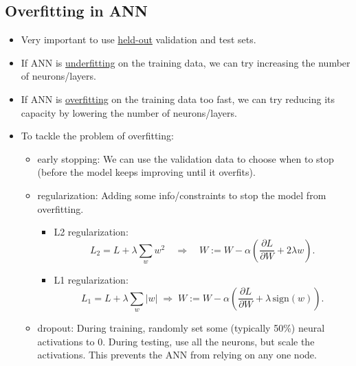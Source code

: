 \documentclass[twocolumn,landscape,10pt]{article}
\theoremstyle{definition}
\begin{document}
\subsection{Overfitting in ANN}

\begin{itemize}
    \item Very important to use \underline{held-out} validation and test sets.
    \item If ANN is \underline{underfitting} on the training data, we can try
        increasing the number of neurons/layers.
    \item If ANN is \underline{overfitting} on the training data too fast, we
        can try reducing its capacity by lowering the number of neurons/layers.
    \item To tackle the problem of overfitting:
        \begin{itemize}
            \item early stopping:
                We can use the validation data to choose when to stop
                (before the model keeps improving until it overfits).
            \item regularization: Adding some info/constraints to stop the model
                from overfitting.
                \begin{itemize}
                    \item L2 regularization:
                        \[
                            L_2 = L + \lambda \sum_w w^{2}
                            \quad\Longrightarrow\quad
                            W := W - \alpha\left(\frac{\partial L}{\partial
                            W}+2\lambda w\right).
                        \]
                    \item L1 regularization:
                        \[
                            L_1 = L + \lambda \sum_w|w|
                            \;\Longrightarrow\;
                            W := W - \alpha\left(\frac{\partial L}{\partial
                            W}+\lambda\,\text{sign}(w)\right).
                        \]
                \end{itemize} 
            \item dropout: During training, randomly set some (typically 50\%)
                neural activations to 0. During testing, use all the neurons,
                but scale the activations. This prevents the ANN from relying on
                any one node.
        \end{itemize} 
\end{itemize} 
\end{document}
